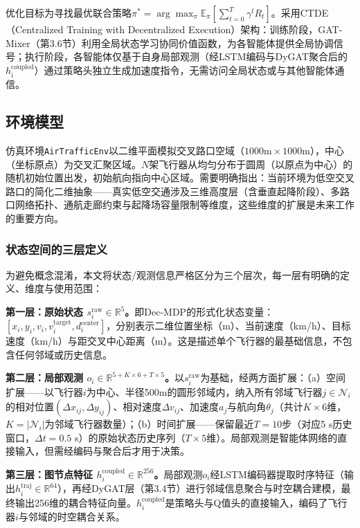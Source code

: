 \documentclass[12pt,a4paper,UTF8]{ctexart}
\begin{document}
优化目标为寻找最优联合策略$\pi^* = \arg\max_\pi \mathbb{E}_{\pi}\left[\sum_{t=0}^{T} \gamma^t R_t\right]$。采用CTDE（Centralized Training with Decentralized Execution）架构：训练阶段，GAT-Mixer（第3.6节）利用全局状态学习协同价值函数，为各智能体提供全局协调信号；执行阶段，各智能体仅基于自身局部观测（经LSTM编码与DyGAT聚合后的$h_i^{\text{coupled}}$）通过策略头独立生成加速度指令，无需访问全局状态或与其他智能体通信。

\subsection{环境模型}

仿真环境\texttt{AirTrafficEnv}以二维平面模拟交叉路口空域（$1000\text{m} \times 1000\text{m}$），中心（坐标原点）为交叉汇聚区域。$N$架飞行器从均匀分布于圆周（以原点为中心）的随机初始位置出发，初始航向指向中心区域。需要明确指出：当前环境为低空交叉路口的简化二维抽象——真实低空交通涉及三维高度层（含垂直起降阶段）、多路口网络拓扑、通航走廊约束与起降场容量限制等维度，这些维度的扩展是未来工作的重要方向。

\subsubsection{状态空间的三层定义}

为避免概念混淆，本文将状态/观测信息严格区分为三个层次，每一层有明确的定义、维度与使用范围：

\textbf{第一层：原始状态 $s_i^{\text{raw}} \in \mathbb{R}^5$。}即Dec-MDP的形式化状态变量：$[x_i, y_i, v_i, v_i^{\text{target}}, d_i^{\text{center}}]$，分别表示二维位置坐标（m）、当前速度（km/h）、目标速度（km/h）与距交叉中心距离（m）。这是描述单个飞行器的最基础信息，不包含任何邻域或历史信息。

\textbf{第二层：局部观测 $o_i \in \mathbb{R}^{5 + K \times 6 + T \times 5}$。}以$s_i^{\text{raw}}$为基础，经两方面扩展：（a）空间扩展——以飞行器$i$为中心、半径500m的圆形邻域内，纳入所有邻域飞行器$j \in \mathcal{N}_i$的相对位置$(\Delta x_{ij}, \Delta y_{ij})$、相对速度$\Delta v_{ij}$、加速度$a_j$与航向角$\theta_j$（共计$K \times 6$维，$K = |\mathcal{N}_i|$为邻域飞行器数量）；（b）时间扩展——保留最近$T=10$步（对应5 s历史窗口，$\Delta t=0.5$ s）的原始状态历史序列（$T \times 5$维）。局部观测是智能体网络的直接输入，但需经编码与聚合后才用于决策。

\textbf{第三层：图节点特征 $h_i^{\text{coupled}} \in \mathbb{R}^{256}$。}局部观测$o_i$经LSTM编码器提取时序特征（输出$h_i^{\text{traj}} \in \mathbb{R}^{64}$），再经DyGAT层（第3.4节）进行邻域信息聚合与时空耦合建模，最终输出256维的耦合特征向量。$h_i^{\text{coupled}}$是策略头与Q值头的直接输入，编码了飞行器$i$与邻域的时空耦合关系。
\end{document}
